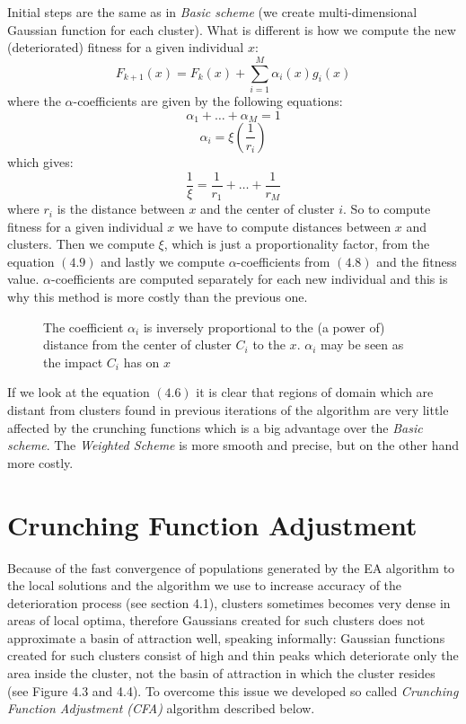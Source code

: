 Initial steps are the same as in \textit{Basic scheme} (we create 
multi-dimensional Gaussian function for each cluster). What is different
is how we compute the new (deteriorated) fitness for a given individual $x$:
\begin{equation}
F_{k+1}(x)=F_k(x) + \sum_{i=1}^M \alpha_i(x) g_i(x)
\end{equation}
where the $\alpha$-coefficients are given by the following equations:
\begin{equation}
	\alpha_1 + \ldots + \alpha_M = 1
\end{equation}
\begin{equation}
	\alpha_i = \xi(\frac{1}{r_i})
\end{equation}
which gives:
\begin{equation}
\frac{1}{\xi}=\frac{1}{r_1} + \ldots + \frac{1}{r_M}
\end{equation}
where $r_i$ is the distance between $x$ and the center of cluster $i$. So to compute fitness for a 
given individual $x$ we have to compute distances between $x$ and clusters. 
Then we compute $\xi$, which is just a proportionality
factor, from the equation $(4.9)$ and lastly we compute $\alpha$-coefficients
from $(4.8)$ and the fitness value. $\alpha$-coefficients are computed separately for each new 
individual and this is why this method is more costly than the previous one.
\begin{figure}
  \centering
  \caption{The coefficient $\alpha_i$ is inversely proportional to the (a power
  of) distance from the center of cluster $C_i$ to the $x$. $\alpha_i$ may
  be seen as the impact $C_i$ has on $x$}
  \label{weightedScheme}
\end{figure}

If we look at the equation $(4.6)$ it is clear that regions of domain
which are distant from clusters found in previous iterations of the algorithm
are very little affected by the crunching functions which is a big advantage
over the \textit{Basic scheme}. 
The \textit{Weighted Scheme} is more smooth and precise, but on the other hand
more costly.

\section{Crunching Function Adjustment}
Because of the fast convergence of populations
generated by the EA algorithm to the local solutions and the algorithm we use
to increase accuracy of the deterioration process (see section 4.1),
clusters sometimes becomes very dense in areas of local optima, therefore Gaussians created for such
clusters does not approximate a basin of attraction well, speaking informally:
Gaussian functions created for such clusters consist of high and thin peaks
which deteriorate only the area inside the cluster, not the basin of attraction
in which the cluster resides (see Figure 4.3 and 4.4).
To overcome this issue we developed so called \textit{Crunching Function
Adjustment (CFA)} algorithm described below.

